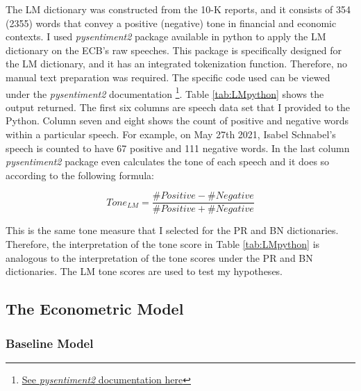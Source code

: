 The LM dictionary was constructed from the 10-K reports, and it consists of 354 (2355) words that convey a positive (negative) tone in financial and economic contexts. I used \textit{pysentiment2} package available in python to apply the LM dictionary on the ECB's raw speeches. This package is specifically designed for the LM dictionary, and it has an integrated tokenization function. Therefore, no manual text preparation was required. The specific code used can be viewed under the \textit{pysentiment2} documentation \footnote{\href{https://nickderobertis.github.io/pysentiment/}{See \textit{pysentiment2} documentation here}}. Table \ref{tab:LMpython} shows the output returned. The first six columns are speech data set that I provided to the Python. Column seven and eight shows the count of positive and negative words within a particular speech. For example, on May 27th 2021, Isabel Schnabel's speech is counted to have 67 positive and 111 negative words. In the last column \textit{pysentiment2} package even calculates the tone of each speech and it does so according to the following formula:

\begin{equation}
    Tone_{LM}=\frac{\#Positive-\#Negative}{\#Positive+\#Negative}
\end{equation}

This is the same tone measure that I selected for the PR and BN dictionaries. Therefore, the interpretation of the tone score in Table \ref{tab:LMpython} is analogous to the interpretation of the tone scores under the PR and BN dictionaries. The LM tone scores are  used to test my hypotheses. 




\subsection{The Econometric Model}


\subsubsection{Baseline Model}




